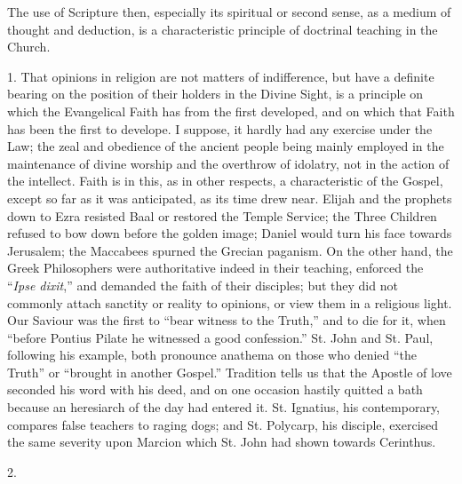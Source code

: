 The use of Scripture then, especially its spiritual or second
sense, as a medium of thought and deduction, is a characteristic
principle of doctrinal teaching in the Church.


1. That opinions in religion are not matters of indifference, but
have a definite bearing on the position of their holders in the Divine
Sight, is a principle on which the Evangelical Faith has from the
first developed, and on which that Faith has been the first to
develope. I suppose, it hardly had any exercise under the Law; the
zeal and obedience of the ancient people being mainly employed in the
maintenance of divine worship and the overthrow of idolatry, not in
the action of the intellect. Faith is in this, as in other respects, a
characteristic of the Gospel, except so far as it was anticipated, as
its time drew near. Elijah and the prophets down to Ezra resisted Baal
or restored the Temple Service; the Three Children refused to bow down
before the golden image; Daniel would turn his face towards Jerusalem;
the Maccabees spurned the Grecian paganism. On the other hand, the
Greek Philosophers were authoritative indeed in their teaching,
enforced the ``\emph{Ipse dixit},'' and demanded the faith of
their disciples; but they did not commonly attach sanctity or reality
to opinions, or view them in a religious light. Our Saviour was the
first to ``bear witness to the Truth,'' and to die for it,
when ``before Pontius Pilate he witnessed a good confession.''
St. John and St. Paul, following his example, both pronounce anathema
on those who denied ``the Truth'' or ``brought in another
Gospel.'' Tradition tells us that the Apostle of love seconded his
word with his deed, and on one occasion hastily quitted a bath because
an heresiarch of the day had entered it. St. Ignatius, his
contemporary, compares false teachers to raging dogs; and St. Polycarp,
his disciple, exercised the same severity upon Marcion which St. John
had shown towards Cerinthus.

2.

